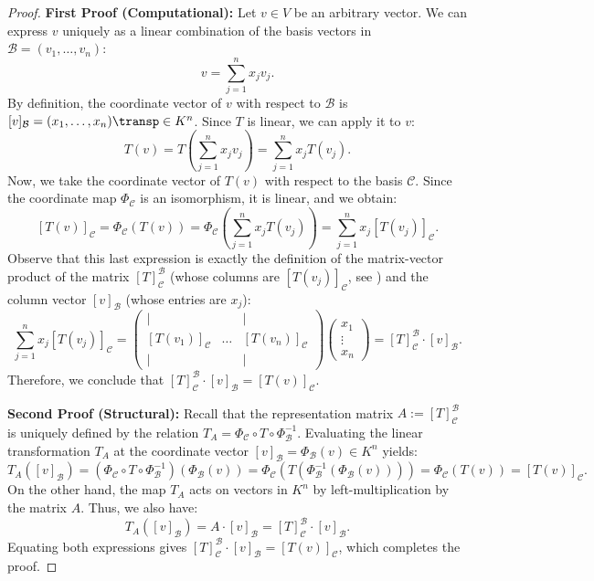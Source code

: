 \begin{proof}
\textbf{First Proof (Computational):} Let $v \in V$ be an arbitrary vector. We can express $v$ uniquely as a linear combination of the basis vectors in $\mathcal{B} = (v_1, \dots, v_n)$:
\[
v = \sum_{j=1}^n x_j v_j.
\]
By definition, the coordinate vector of $v$ with respect to $\mathcal{B}$ is $[v]_{\mathcal{B}} = (x_1, \dots, x_n)\transp \in K^n$. Since $T$ is linear, we can apply it to $v$:
\[
T(v) = T\left( \sum_{j=1}^n x_j v_j \right) = \sum_{j=1}^n x_j T(v_j).
\]
Now, we take the coordinate vector of $T(v)$ with respect to the basis $\mathcal{C}$. Since the coordinate map $\Phi_{\mathcal{C}}$ is an isomorphism, it is linear, and we obtain:
\[
[T(v)]_{\mathcal{C}} = \Phi_{\mathcal{C}}(T(v)) = \Phi_{\mathcal{C}}\left( \sum_{j=1}^n x_j T(v_j) \right) = \sum_{j=1}^n x_j [T(v_j)]_{\mathcal{C}}.
\]
Observe that this last expression is exactly the definition of the matrix-vector product of the matrix $[T]_{\mathcal{C}}^{\mathcal{B}}$ (whose columns are $[T(v_j)]_{\mathcal{C}}$, see ) and the column vector $[v]_{\mathcal{B}}$ (whose entries are $x_j$):
\[
\sum_{j=1}^n x_j [T(v_j)]_{\mathcal{C}} = 
\begin{pmatrix}
| & & | \\
[T(v_1)]_{\mathcal{C}} & \dots & [T(v_n)]_{\mathcal{C}} \\
| & & |
\end{pmatrix}
\begin{pmatrix}
x_1 \\ \vdots \\ x_n
\end{pmatrix}
= [T]_{\mathcal{C}}^{\mathcal{B}} \cdot [v]_{\mathcal{B}}.
\]
Therefore, we conclude that $[T]_{\mathcal{C}}^{\mathcal{B}} \cdot [v]_{\mathcal{B}} = [T(v)]_{\mathcal{C}}$.

\textbf{Second Proof (Structural):} Recall that the representation matrix $A := [T]_{\mathcal{C}}^{\mathcal{B}}$ is uniquely defined by the relation $T_A = \Phi_{\mathcal{C}} \circ T \circ \Phi_{\mathcal{B}}^{-1}$. Evaluating the linear transformation $T_A$ at the coordinate vector $[v]_{\mathcal{B}} = \Phi_{\mathcal{B}}(v) \in K^n$ yields:
\[
T_A([v]_{\mathcal{B}}) = \left(\Phi_{\mathcal{C}} \circ T \circ \Phi_{\mathcal{B}}^{-1}\right) (\Phi_{\mathcal{B}}(v)) = \Phi_{\mathcal{C}}\left(T\left(\Phi_{\mathcal{B}}^{-1}(\Phi_{\mathcal{B}}(v))\right)\right) = \Phi_{\mathcal{C}}(T(v)) = [T(v)]_{\mathcal{C}}.
\]
On the other hand, the map $T_A$ acts on vectors in $K^n$ by left-multiplication by the matrix $A$. Thus, we also have:
\[
T_A([v]_{\mathcal{B}}) = A \cdot [v]_{\mathcal{B}} = [T]_{\mathcal{C}}^{\mathcal{B}} \cdot [v]_{\mathcal{B}}.
\]
Equating both expressions gives $[T]_{\mathcal{C}}^{\mathcal{B}} \cdot [v]_{\mathcal{B}} = [T(v)]_{\mathcal{C}}$, which completes the proof.
\end{proof}

